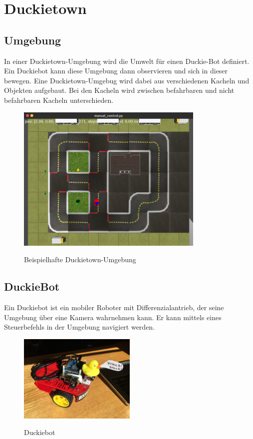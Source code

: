 \chapter{Duckietown}

\section{Umgebung}

In einer Duckietown-Umgebung wird die Umwelt für einen Duckie-Bot definiert. Ein Duckiebot kann diese Umgebung dann observieren und sich in dieser bewegen. Eine Duckietown-Umgebug wird dabei aus verschiedenen Kacheln und Objekten aufgebaut. Bei den Kacheln wird zwischen befahrbaren und nicht befahrbaren Kacheln unterschieden. 

\begin{figure}[H]
	\centering
	\includegraphics[width=0.8\textwidth]{kapitel2/images/duckietown-umgebung.png}
	\label{fig:duckietown-umgebung}
	\caption{Beispielhafte Duckietown-Umgebung}
\end{figure}

\newpage

\section{DuckieBot}

Ein Duckiebot ist ein mobiler Roboter mit Differenzialantrieb, der seine Umgebung über eine Kamera wahrnehmen kann. Er kann mittels eines Steuerbefehls in der Umgebung navigiert werden. \cite{duckietown_platform}

\begin{figure}[H]
	\centering
	\includegraphics[width=0.5\textwidth]{kapitel2/images/duckiebot.jpg}
	\label{fig:duckiebot}
	\caption{Duckiebot}
\end{figure}


